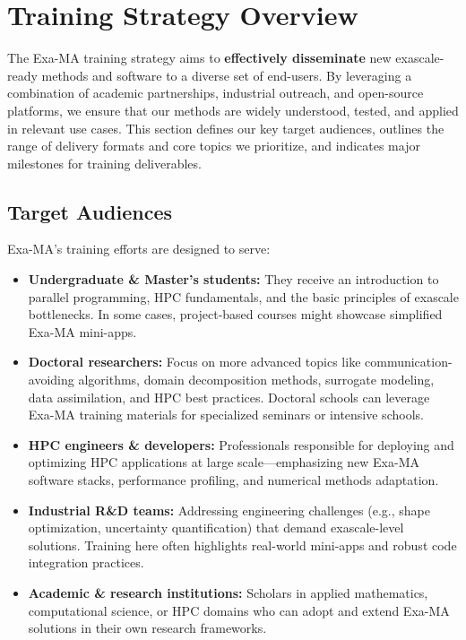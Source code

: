 \section{Training Strategy Overview}
\label{sec:strategy}

The Exa-MA training strategy aims to \textbf{effectively disseminate} new exascale-ready methods and software to a diverse set of end-users. By leveraging a combination of academic partnerships, industrial outreach, and open-source platforms, we ensure that our methods are widely understood, tested, and applied in relevant use cases. This section defines our key target audiences, outlines the range of delivery formats and core topics we prioritize, and indicates major milestones for training deliverables.

\subsection{Target Audiences}
Exa-MA’s training efforts are designed to serve:
\begin{itemize}
    \item \textbf{Undergraduate \& Master’s students:} 
    They receive an introduction to parallel programming, HPC fundamentals, and the basic principles of exascale bottlenecks. In some cases, project-based courses might showcase simplified Exa-MA mini-apps.
    \item \textbf{Doctoral researchers:} 
    Focus on more advanced topics like communication-avoiding algorithms, domain decomposition methods, surrogate modeling, data assimilation, and HPC best practices. Doctoral schools can leverage Exa-MA training materials for specialized seminars or intensive schools.
    \item \textbf{HPC engineers \& developers:} 
    Professionals responsible for deploying and optimizing HPC applications at large scale—emphasizing new Exa-MA software stacks, performance profiling, and numerical methods adaptation.
    \item \textbf{Industrial R\&D teams:} 
    Addressing engineering challenges (e.g., shape optimization, uncertainty quantification) that demand exascale-level solutions. Training here often highlights real-world mini-apps and robust code integration practices.
    \item \textbf{Academic \& research institutions:} 
    Scholars in applied mathematics, computational science, or HPC domains who can adopt and extend Exa-MA solutions in their own research frameworks.
\end{itemize}


